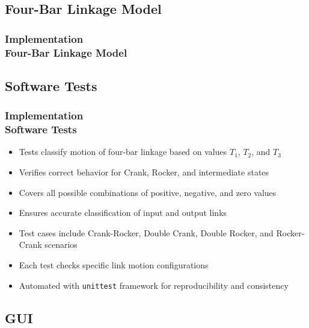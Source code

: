 \documentclass[ucs,10pt]{beamer}
\begin{document}
\subsection{Four-Bar Linkage Model}

\begin{frame}
\frametitle{Implementation \\
	\small \color{rwth-blue} Four-Bar Linkage Model}
\end{frame}

\subsection{Software Tests}

\begin{frame}
    \frametitle{Implementation \\
    \small \color{rwth-blue} Software Tests}
    
    \begin{itemize}
        \item Tests classify motion of four-bar linkage based on values \( T_1 \), \( T_2 \), and \( T_3 \)
        \item Verifies correct behavior for Crank, Rocker, and intermediate states
        \item Covers all possible combinations of positive, negative, and zero values
        \item Ensures accurate classification of input and output links
        \item Test cases include Crank-Rocker, Double Crank, Double Rocker, and Rocker-Crank scenarios
        \item Each test checks specific link motion configurations
        \item Automated with \texttt{unittest} framework for reproducibility and consistency
    \end{itemize}
    
\end{frame}
\subsection{GUI}
\end{document}
